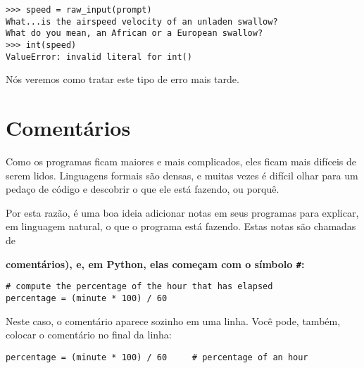 {{{{{{{{{{{{{{{{\beforeverb
\begin{verbatim}
>>> speed = raw_input(prompt)
What...is the airspeed velocity of an unladen swallow?
What do you mean, an African or a European swallow?
>>> int(speed)
ValueError: invalid literal for int()
\end{verbatim}
\afterverb
%

Nós veremos como tratar este tipo de erro mais tarde.


\section{Comentários}


Como os programas ficam maiores e mais complicados, eles ficam mais difíceis 
de serem lidos. Linguagens formais são densas, e muitas vezes é difícil 
olhar para um pedaço de código e descobrir o que ele está fazendo, ou porquê.

Por esta razão, é uma boa ideia adicionar notas em seus programas para explicar,
em linguagem natural, o que o programa está fazendo. Estas notas são chamadas 
de {\bf comentários), e, em Python, elas começam com o símbolo \verb"#":

\beforeverb
\begin{verbatim}
# compute the percentage of the hour that has elapsed
percentage = (minute * 100) / 60
\end{verbatim}
\afterverb
%

Neste caso, o comentário aparece sozinho em uma linha. Você pode, também, colocar
o comentário no final da linha:

\beforeverb
\begin{verbatim}
percentage = (minute * 100) / 60     # percentage of an hour
\end{verbatim}
\afterverb
%

}}}}}}}}}}}}}}}}}
